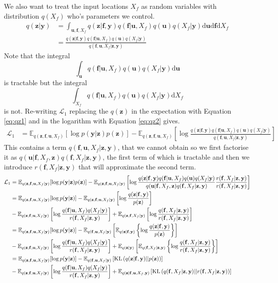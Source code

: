 \documentclass[12pt]{article}
\newcommand{\ub}{\mathbf{u}}
\newcommand{\zb}{\mathbf{z}}
\newcommand{\fb}{\mathbf{f}}
\newcommand{\yb}{\mathbf{y}}
\newcommand{\dd}{\mathrm{d}}
\newcommand{\Lo}{\mathcal{L}_1}
\newcommand{\Ex}{\mathbb{E}}
\newcommand{\KL}{\mathrm{KL}}
\begin{document}
We also want to treat the input locations $X_f$ as random variables with distribution $q(X_f)$ who's parameters we control.
%
\begin{align}
q(\zb|\yb) &= \int_{\ub,\fb,X_f} q(\zb|\fb, \yb)q(\fb|\ub,X_f)q(\ub)q(X_f|\yb) \dd\ub \dd\fb \dd X_f \label{eq:qz1} \\
&= \frac{q(\zb |\fb, \yb)q(\fb|\ub,X_f)q(\ub)q(X_f|\yb)}{q(\fb,\ub,X_f|\zb,\yb)} \label{eq:qz2}
\end{align}
%
Note that the integral
%
\begin{equation}
\int_{\ub} q(\fb|\ub,X_f)q(\ub)q(X_f|\yb) \dd\ub
\end{equation}
%
is tractable but the integral
\begin{equation}
\int_{X_f} q(\fb|\ub,X_f)q(\ub)q(X_f|\yb) \dd X_f
\end{equation}
%
is not.
%
Re-writing $\Lo$ replacing the $q(\zb)$ in the expectation with Equation \ref{eq:qz1} and in the logarithm with Equation \ref{eq:qz2} gives.
%
\begin{align}
\Lo &= \Ex_{q(\zb,\fb,\ub,X_f)}[\log p(\yb|\zb)p(\zb)] - \Ex_{q(\zb,\fb,\ub,X_f)}\left[\log\frac{q(\zb |\fb, \yb)q(\fb|\ub,X_f)q(\ub)q(X_f|\yb)}{q(\fb,\ub,X_f|\zb,\yb)}\right]
\end{align}
%
This contains a term $q(\fb,\ub,X_f|\zb,\yb)$, that we cannot obtain so we first factorise it as $q(\ub|\fb, X_f, \zb)q(\fb,X_f | \zb,\yb)$, the first term of which is tractable and then we introduce $r(\fb,X_f|\zb,\yb)$ that will approximate the second term.
%
\begin{align}
\Lo &= \Ex_{q(\zb,\fb,\ub,X_f|\yb)}[\log p(\yb|\zb)p(\zb)] - \Ex_{q(\zb,\fb,\ub,X_f|\yb)}\left[\log\frac{q(\zb |\fb, \yb)q(\fb|\ub,X_f)q(\ub)q(X_f|\yb)}{q(\ub|\fb, X_f, \zb)q(\fb,X_f | \zb,\yb)} \frac{r(\fb,X_f|\zb,\yb)}{r(\fb,X_f|\zb,\yb)}\right] \\
&= \Ex_{q(\zb,\fb,\ub,X_f|\yb)}[\log p(\yb|\zb)] - \Ex_{q(\zb,\fb,\ub,X_f|\yb)}\left[\log\frac{q(\zb|\fb,\yb)}{p(\zb)}\right] \notag \\
&-\Ex_{q(\zb,\fb,\ub,X_f|\yb)}\left[\log\frac{q(\fb|\ub,X_f)q(X_f|\yb)}{r(\fb,X_f|\zb,\yb)}\right] + \Ex_{q(\zb,\fb,X_f|\yb)}\left[\log\frac{q(\fb,X_f|\zb,\yb)}{r(\fb,X_f|\zb,\yb)}\right] \\
&= \Ex_{q(\zb,\fb,\ub,X_f|\yb)}[\log p(\yb|\zb)] - \Ex_{q(\fb,\ub,X_f|\yb)}\left[\Ex_{q(\zb|\fb,\yb)}\left\{\log\frac{q(\zb|\fb,\yb)}{p(\zb)}\right\}\right] \notag \\
&-\Ex_{q(\zb,\fb,\ub,X_f|\yb)}\left[\log\frac{q(\fb|\ub,X_f)q(X_f|\yb)}{r(\fb,X_f|\zb,\yb)}\right] + \Ex_{q(\zb|\yb)}\left[\Ex_{q(\fb,X_f|\zb,\yb)}\left\{\log\frac{q(\fb,X_f|\zb,\yb)}{r(\fb,X_f|\zb,\yb)}\right\}\right] \\
&= \Ex_{q(\zb,\fb,\ub,X_f|\yb)}[\log p(\yb|\zb)] - \Ex_{q(\fb,\ub,X_f|\yb)}\left[\KL\left(q(\zb|\fb,\yb)||p(\zb)\right)\right] \notag \\
&-\Ex_{q(\zb,\fb,\ub,X_f|\yb)}\left[\log\frac{q(\fb|\ub,X_f)q(X_f|\yb)}{r(\fb,X_f|\zb,\yb)}\right] + \Ex_{q(\zb|\fb,\ub,X_f,\yb)}\left[\KL\left(q(\fb,X_f|\zb,\yb)||r(\fb,X_f|\zb,\yb)\right)\right]
\end{align}
\end{document}
